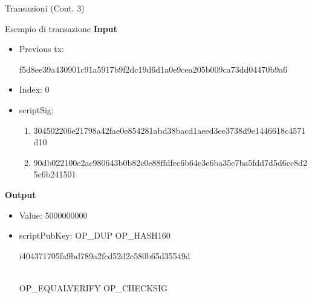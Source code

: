 \documentclass{beamer}
\begin{document}
  
  
  
  \begin{frame}{Transazioni (Cont. 3)}
    \begin{block}{Esempio di transazione}
        \textbf{Input}\\
        \begin{itemize}
            \item Previous tx: \begin{tiny}f5d8ee39a430901c91a5917b9f2dc19d6d1a0e9cea205b009ca73dd04470b9a6\end{tiny}
            \item Index: 0
            \item scriptSig: 
            \begin{enumerate}
                \item \begin{tiny}304502206e21798a42fae0e854281abd38bacd1aeed3ee3738d9e1446618c4571d10\end{tiny}
                \item \begin{tiny}90db022100e2ac980643b0b82c0e88ffdfec6b64e3e6ba35e7ba5fdd7d5d6cc8d25c6b241501\end{tiny}
            \end{enumerate}
        \end{itemize}

        \textbf{Output}\\
        \begin{itemize}
            \item Value: 5000000000
            \item scriptPubKey: OP\_DUP OP\_HASH160 \begin{tiny}i404371705fa9bd789a2fcd52d2c580b65d35549d\end{tiny}\\ OP\_EQUALVERIFY OP\_CHECKSIG
        \end{itemize}
    \end{block}
  \end{frame}
  
  
  
  
\end{document}
